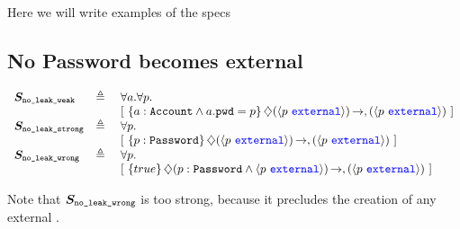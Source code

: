 Here we will write examples of the specs

\subsection{No Password becomes external}

$\begin{array}{lll}
 \Spec{no\_leak\_weak} & \triangleq &  \forall a.  \forall p.\\
 & & [\ \onlyIf{a:\prg{Account}\wedge a.\prg{pwd}=p} {\external{p}} {\external{p}}\  ] 
\\

 \Spec{no\_leak\_strong} & \triangleq &  \forall p.\\
 & & [\ \onlyIf{p:\prg{Password}} {\external{p}} {\external{p}}\  ] 
\\
 \Spec{no\_leak\_wrong} & \triangleq\ & \forall p. \\
 & &  [\ \onlyIf{true} {p:\prg{Password} \wedge \external{p}} {\external{p}} \ ] 

\end{array}
$

\noindent
Note that  $\boldmath{S}_{{\texttt{no\_leak\_wrong}}} $ is too strong, because it precludes the creation of any external  .